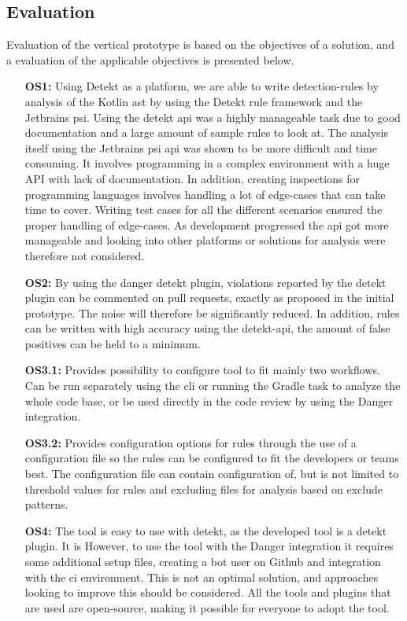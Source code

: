 \documentclass{report}
\begin{document}
\subsection*{Evaluation}
Evaluation of the vertical prototype is based on the objectives of a solution, and a evaluation of the applicable objectives is presented below.
\begin{itemize}
    \item [\textbf{OS1:}] Using Detekt as a platform, we are able to write detection-rules by analysis of the Kotlin \gls{ast} by using the Detekt rule framework and the  Jetbrains \gls{psi}. Using the detekt \gls{api} was a highly manageable task due to good documentation and a large amount of sample rules to look at. The analysis itself using the Jetbrains \gls{psi} \gls{api} was shown to be more difficult and time consuming. It involves programming in a complex environment with a huge API with lack of documentation. In addition, creating inspections for programming languages involves handling a lot of edge-cases that can take time to cover. Writing test cases for all the different scenarios ensured the proper handling of edge-cases. As development progressed the \gls{api} got more manageable and looking into other platforms or solutions for analysis were therefore not considered.   
    
    \item [\textbf{OS2:}] By using the danger detekt plugin, violations reported by the detekt plugin can be commented on pull requests, exactly as proposed in the initial prototype. The noise will therefore be significantly reduced. In addition, rules can be written with high accuracy using the detekt-api, the amount of false positives can be held to a minimum. 
    
    \item [\textbf{OS3.1:}] Provides possibility to configure tool to fit mainly two workflows. Can be run separately using the \gls{cli} or running the Gradle task to analyze the whole code base, or be used directly in the code review by using the Danger integration.
    \item [\textbf{OS3.2:}] Provides configuration options for rules through the use of a configuration file so the rules can be configured to fit the developers or teams best. The configuration file can contain configuration of, but is not limited to threshold values for rules and excluding files for analysis based on exclude patterns. 
    
    \item [\textbf{OS4:}] The tool is easy to use with detekt, as the developed tool is a detekt plugin. It is However, to use the tool with the Danger integration it requires some additional setup files, creating a bot user on Github and integration with the \gls{ci} environment. This is not an optimal solution, and approaches looking to improve this should be considered. All the tools and plugins that are used are open-source, making it possible for everyone to adopt the tool.
    

\end{itemize}
\end{document}
